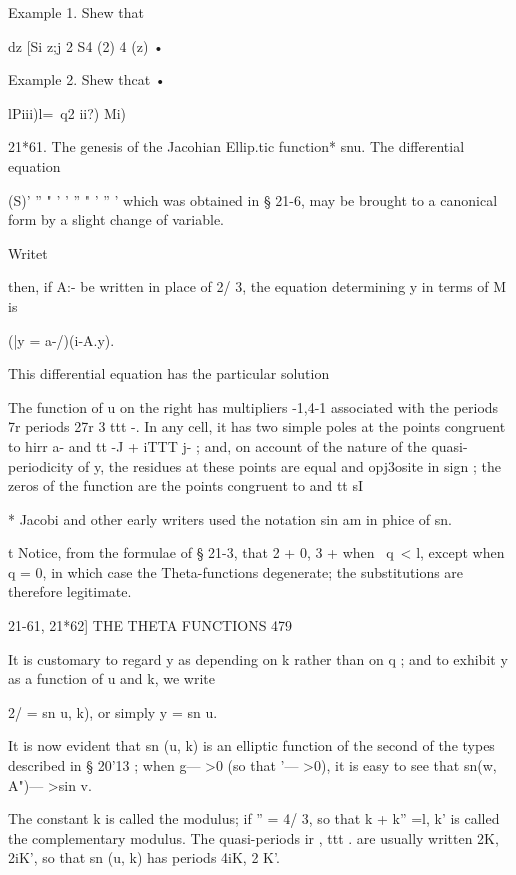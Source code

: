 Example 1. Shew that 

dz [Si  z;j 2 S4 (2)  4 (z) • 

Example 2. Shew thcat • 

lPiii)l=\ q2 ii?) Mi) 

21*61. The genesis of the Jacohian Ellip.tic function* snu. 
The differential equation 

(S)'   '' "  ' '  '' "  ' '' ' 
which was obtained in § 21-6, may be brought to a canonical form by a slight 
change of variable. 

Writet  %

then, if A:- be written in place of  2/ 3, the equation determining y in terms 
of M is 

(|y = a-/)(i-A.y). 

This differential equation has the particular solution 

The function of u on the right has multipliers -1,4-1 associated with 
the periods 7r%
periods 27r 3  ttt -. In any cell, it has two simple poles at the points 
congruent to hirr a- and tt -J  + iTTT j- ; and, on account of the nature of the 
quasi-periodicity of y, the residues at these points are equal and opj3osite in 
sign ; the zeros of the function are the points congruent to and tt sI 

* Jacobi and other early writers used the notation sin am in phice of sn. 

t Notice, from the formulae of § 21-3, that  2 + 0,  3 + when \ q\ < l, except when q = 0, in 
which case the Theta-functions degenerate; the substitutions are therefore legitimate. 



21-61, 21*62] THE THETA FUNCTIONS 479 

It is customary to regard y as depending on k rather than on q ; and to 
exhibit y as a function of u and k, we write 

2/ = sn  u, k), 
or simply y = sn u. 

It is now evident that sn (u, k) is an elliptic function of the second 
of the types described in § 20'13 ; when g— >0 (so that  '— >0), it is easy to see 
that sn(w, A")— >sin v. 

The constant k is called the modulus; if  ''  =  4/ 3, so that k  + k'' =l, 
k' is called the complementary modulus. The quasi-periods ir , ttt .  are 
usually written 2K, 2iK', so that sn (u, k) has periods 4iK, 2 K'. 

